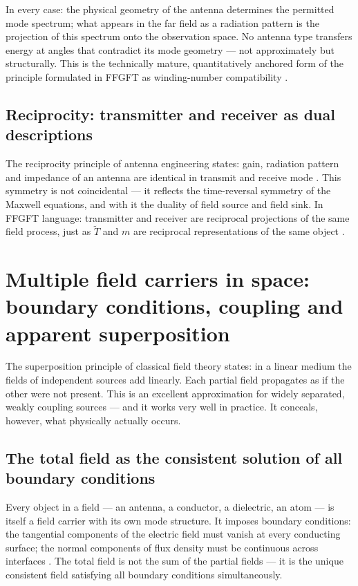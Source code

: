 In every case: the physical geometry of the antenna determines the permitted
mode spectrum; what appears in the far field as a radiation pattern is the
projection of this spectrum onto the observation space. No antenna type
transfers energy at angles that contradict its mode geometry --- not
approximately but structurally. This is the technically mature, quantitatively
anchored form of the principle formulated in FFGFT as winding-number
compatibility \SM.

\subsection*{Reciprocity: transmitter and receiver as dual descriptions}

The reciprocity principle of antenna engineering states: gain, radiation
pattern and impedance of an antenna are identical in transmit and receive
mode \cite{Balanis2016,Griffiths1999}. This symmetry is not coincidental ---
it reflects the time-reversal symmetry of the Maxwell equations, and with it
the duality of field source and field sink. In FFGFT language: transmitter
and receiver are reciprocal projections of the same field process, just as
$\tilde{T}$ and $m$ are reciprocal representations of the same object \SM.

\section{Multiple field carriers in space: boundary conditions, coupling and apparent superposition}

The superposition principle of classical field theory states: in a linear
medium the fields of independent sources add linearly. Each partial field
propagates as if the other were not present. This is an excellent
approximation for widely separated, weakly coupling sources --- and it
works very well in practice. It conceals, however, what physically actually
occurs.

\subsection*{The total field as the consistent solution of all boundary conditions}

Every object in a field --- an antenna, a conductor, a dielectric, an atom
--- is itself a field carrier with its own mode structure. It imposes
boundary conditions: the tangential components of the electric field must
vanish at every conducting surface; the normal components of flux density
must be continuous across interfaces \EM. The total field is not the sum of
the partial fields --- it is the unique consistent field satisfying all
boundary conditions simultaneously.

